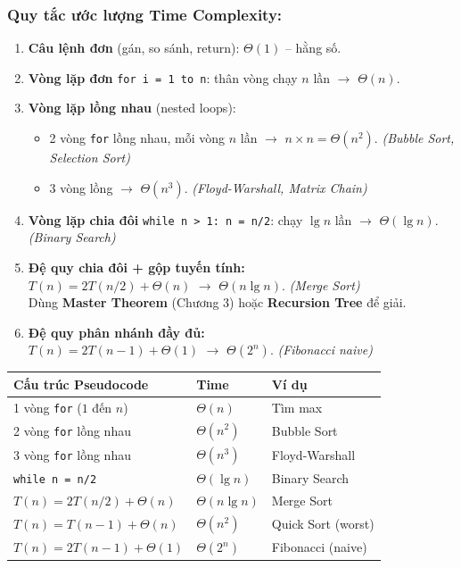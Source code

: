 \documentclass[10pt]{article}
\begin{document}
\subsubsection{Quy tắc ước lượng Time Complexity:}

\begin{enumerate}
\item \textbf{Câu lệnh đơn} (gán, so sánh, return): $\Theta(1)$ -- hằng số.

\item \textbf{Vòng lặp đơn} \texttt{for i = 1 to n}: thân vòng chạy $n$ lần $\to$ $\Theta(n)$.

\item \textbf{Vòng lặp lồng nhau} (nested loops):
\begin{itemize}
\item 2 vòng \texttt{for} lồng nhau, mỗi vòng $n$ lần $\to$ $n \times n = \Theta(n^2)$. \textit{(Bubble Sort, Selection Sort)}
\item 3 vòng lồng $\to$ $\Theta(n^3)$. \textit{(Floyd-Warshall, Matrix Chain)}
\end{itemize}

\item \textbf{Vòng lặp chia đôi} \texttt{while n > 1: n = n/2}: chạy $\lg n$ lần $\to$ $\Theta(\lg n)$. \textit{(Binary Search)}

\item \textbf{Đệ quy chia đôi + gộp tuyến tính:}\\
$T(n) = 2T(n/2) + \Theta(n)$ $\to$ $\Theta(n \lg n)$. \textit{(Merge Sort)}\\
Dùng \textbf{Master Theorem} (Chương 3) hoặc \textbf{Recursion Tree} để giải.

\item \textbf{Đệ quy phân nhánh đầy đủ:}\\
$T(n) = 2T(n-1) + \Theta(1)$ $\to$ $\Theta(2^n)$. \textit{(Fibonacci naive)}
\end{enumerate}

\begin{tcolorbox}[colback=blue!3, colframe=blue!40, boxrule=0.5pt, arc=2pt, title={\small\textbf{Bảng tra nhanh: Cấu trúc code $\to$ Complexity}}]
\begin{tabular}{|l|l|l|}
\hline
\textbf{Cấu trúc Pseudocode} & \textbf{Time} & \textbf{Ví dụ} \\
\hline
1 vòng \texttt{for} ($1$ đến $n$) & $\Theta(n)$ & Tìm max \\
\hline
2 vòng \texttt{for} lồng nhau & $\Theta(n^2)$ & Bubble Sort \\
\hline
3 vòng \texttt{for} lồng nhau & $\Theta(n^3)$ & Floyd-Warshall \\
\hline
\texttt{while n = n/2} & $\Theta(\lg n)$ & Binary Search \\
\hline
$T(n)=2T(n/2)+\Theta(n)$ & $\Theta(n\lg n)$ & Merge Sort \\
\hline
$T(n)=T(n-1)+\Theta(n)$ & $\Theta(n^2)$ & Quick Sort (worst) \\
\hline
$T(n)=2T(n-1)+\Theta(1)$ & $\Theta(2^n)$ & Fibonacci (naive) \\
\hline
\end{tabular}
\end{tcolorbox}
\end{document}
